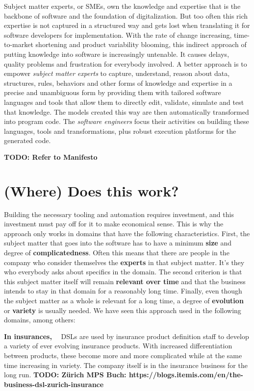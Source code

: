 \documentclass[runningheads]{llncs}
\newcommand\parhead[1]{\vspace{1mm}\noindent\textbf{{#1}}\ \ }
\newcommand\todo[1]{\vspace{1mm}\noindent\textbf{\color{red} {{TODO: {#1}} }}}
\begin{document}
Subject matter experts, or SMEs, own the knowledge and expertise that is the
backbone of software and the foundation of digitalization. But too often this
rich expertise is not captured in a structured way and gets lost when
translating it for software developers for implementation. With the rate of
change increasing, time-to-market shortening and product variability blooming,
this indirect approach of putting knowledge into software is increasingly
untenable. It causes delays, quality problems and frustration for everybody
involved. A better approach is to empower \emph{subject matter experts} to
capture, understand, reason about data, structures, rules, behaviors and other
forms of knowledge and expertise in a precise and unambiguous form by providing
them with tailored software languages and tools that allow them to directly
edit, validate, simulate and test that knowledge. The models created this way
are then automatically transformed into program code. The \emph{software
engineers} focus their activities on building these languages, tools and
transformations, plus robust execution platforms for the generated code.

\todo{Refer to Manifesto}

\section{(Where) Does this work?}

Building the necessary tooling and automation requires investment, and this
investment must pay off for it to make economical sense. This is why the
approach only works in domains that have the following characteristics. First,
the subject matter that goes into the software has to have a minimum
\textbf{size} and degree of \textbf{complicatedness}. Often this means that
there are people in the company who consider themselves the \textbf{experts} in
that subject matter. It's they who everybody asks about specifics in the domain.
The second criterion is that this subject matter itself will remain
\textbf{relevant over time} and that the business intends to stay in that domain
for a reasonably long time. Finally, even though the subject matter as a whole
is relevant for a long time, a degree of \textbf{evolution} or \textbf{variety}
is usually needed. We have seen this approach used in the following domains, among others:

\parhead{In insurances,} DSLs are used by insurance product definition staff to develop a
variety of ever evolving insurance products. With increased differentiation
between products, these become more and more complicated while at the same time
increasing in variety. The company itself is in the insurance business for the
long run. \todo{Zürich MPS Buch: https://blogs.itemis.com/en/the-business-dsl-zurich-insurance}
\end{document}

